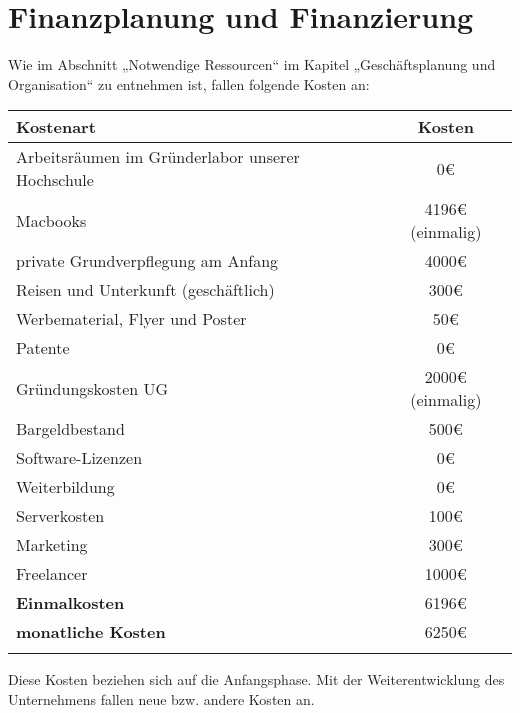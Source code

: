 \chapter{Finanzplanung und Finanzierung}

Wie im Abschnitt „Notwendige Ressourcen“ im Kapitel „Geschäftsplanung und Organisation“ zu entnehmen ist, fallen folgende Kosten an: \\

\begin{tabular}{lc}
  \textbf{Kostenart} & \textbf{Kosten} \\
  \hline
  Arbeitsräumen im Gründerlabor unserer Hochschule & 0\euro \\
  Macbooks & 4196{\euro} (einmalig) \\
  private Grundverpflegung am Anfang & 4000\euro \\
  Reisen und Unterkunft (geschäftlich) & 300\euro \\
  Werbematerial, Flyer und Poster & 50\euro \\
  Patente & 0\euro \\
  Gründungskosten UG & 2000{\euro} (einmalig) \\
  Bargeldbestand & 500\euro \\
  Software-Lizenzen & 0\euro \\
  Weiterbildung & 0\euro \\
  Serverkosten & 100\euro \\
  Marketing & 300\euro \\
  Freelancer & 1000\euro \\
  \hline
  \textbf{Einmalkosten} & 6196{\euro} \\
  \textbf{monatliche Kosten} & 6250\euro \\
  \hline  \\
 \end{tabular}

Diese Kosten beziehen sich auf die Anfangsphase. Mit der Weiterentwicklung des Unternehmens fallen neue bzw. andere Kosten an.

